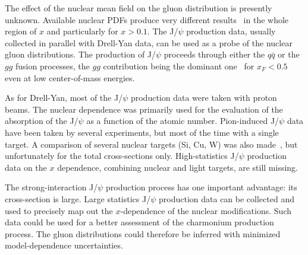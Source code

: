 The effect of the nuclear mean field on the gluon distribution is presently unknown. Available nuclear PDFs produce 
very different results~\cite{Cazaroto:2008qh} in the whole region of $x$ and particularly for $x > 0.1$.
The J/$\psi$ production data, 
usually collected in parallel with Drell-Yan data, can be used as a probe of the nuclear gluon distributions. 
The production of J/$\psi$ proceeds through either the $q\bar q$ or the $gg$ fusion processes, the $gg$ 
contribution being the dominant one~\cite{Vogt:1999dw} for $x_F < 0.5$  even at low center-of-mass energies. 

As for Drell-Yan, most of the J/$\psi$ production data were taken with proton beams. The nuclear dependence 
was primarily used for the evaluation of the absorption of the J/$\psi$ as a function of the atomic number. 
Pion-induced J/$\psi$ data have been taken by several experiments, but most of the time with a single target. 
A comparison of several nuclear targets (Si, Cu, W) was also made~\cite{Alexandrov:1999ch},  
but unfortunately for the total cross-sections only. High-statistics J/$\psi$ production data on   
the $x$ dependence, combining nuclear and light targets, are still missing. 

The strong-interaction J/$\psi$ production process has one important advantage: its cross-section is large. 
Large statistics J/$\psi$ production data can be collected and 
used to precisely map out the $x$-dependence of the nuclear modifications. Such data could be 
used for a better assessment of the charmonium production process.  The gluon distributions could 
therefore be inferred with minimized model-dependence uncertainties.  

